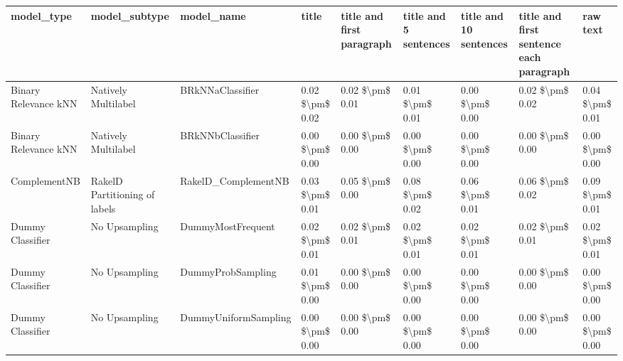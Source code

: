 \begin{tabular}{lllllllll}
\toprule
                     model\_type &                 model\_subtype &                                   model\_name &           title & title and first paragraph & title and 5 sentences & title and 10 sentences & title and first sentence each paragraph &        raw text \\
\midrule
           Binary Relevance kNN &           Natively Multilabel &                             BRkNNaClassifier & 0.02 \$\textbackslash pm\$ 0.02 &           0.02 \$\textbackslash pm\$ 0.01 &       0.01 \$\textbackslash pm\$ 0.01 &        0.00 \$\textbackslash pm\$ 0.00 &                         0.02 \$\textbackslash pm\$ 0.02 & 0.04 \$\textbackslash pm\$ 0.01 \\
           Binary Relevance kNN &           Natively Multilabel &                             BRkNNbClassifier & 0.00 \$\textbackslash pm\$ 0.00 &           0.00 \$\textbackslash pm\$ 0.00 &       0.00 \$\textbackslash pm\$ 0.00 &        0.00 \$\textbackslash pm\$ 0.00 &                         0.00 \$\textbackslash pm\$ 0.00 & 0.00 \$\textbackslash pm\$ 0.00 \\
                   ComplementNB & RakelD Partitioning of labels &                          RakelD\_ComplementNB & 0.03 \$\textbackslash pm\$ 0.01 &           0.05 \$\textbackslash pm\$ 0.00 &       0.08 \$\textbackslash pm\$ 0.02 &        0.06 \$\textbackslash pm\$ 0.01 &                         0.06 \$\textbackslash pm\$ 0.02 & 0.09 \$\textbackslash pm\$ 0.01 \\
               Dummy Classifier &                 No Upsampling &                            DummyMostFrequent & 0.02 \$\textbackslash pm\$ 0.01 &           0.02 \$\textbackslash pm\$ 0.01 &       0.02 \$\textbackslash pm\$ 0.01 &        0.02 \$\textbackslash pm\$ 0.01 &                         0.02 \$\textbackslash pm\$ 0.01 & 0.02 \$\textbackslash pm\$ 0.01 \\
               Dummy Classifier &                 No Upsampling &                            DummyProbSampling & 0.01 \$\textbackslash pm\$ 0.00 &           0.00 \$\textbackslash pm\$ 0.00 &       0.00 \$\textbackslash pm\$ 0.00 &        0.00 \$\textbackslash pm\$ 0.00 &                         0.00 \$\textbackslash pm\$ 0.00 & 0.00 \$\textbackslash pm\$ 0.00 \\
               Dummy Classifier &                 No Upsampling &                         DummyUniformSampling & 0.00 \$\textbackslash pm\$ 0.00 &           0.00 \$\textbackslash pm\$ 0.00 &       0.00 \$\textbackslash pm\$ 0.00 &        0.00 \$\textbackslash pm\$ 0.00 &                         0.00 \$\textbackslash pm\$ 0.00 & 0.00 \$\textbackslash pm\$ 0.00 \\

\end{tabular}
